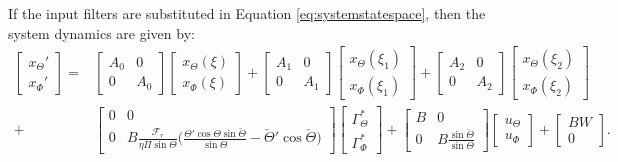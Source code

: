 \documentclass[../main.tex]{subfiles}
\begin{document}
	If the input filters are substituted in Equation \eqref{eq:systemstatespace}, then the system dynamics are given by:
	\begin{align}
	\begin{bmatrix}
	x_\Theta' \\
	x_\Phi'
	\end{bmatrix} =&
	\begin{bmatrix}
	A_0 & 0 \\
	0 & A_0
	\end{bmatrix}
	\begin{bmatrix}
	x_\Theta(\xi) \\
	x_\Phi(\xi)
	\end{bmatrix} + 
	\begin{bmatrix}
	A_1 & 0 \\
	0 & A_1
	\end{bmatrix}
	\begin{bmatrix}
	x_\Theta(\xi_1) \\
	x_\Phi(\xi_1)
	\end{bmatrix} +
	\begin{bmatrix}
	A_2 & 0 \\
	0 & A_2
	\end{bmatrix}
	\begin{bmatrix}
	x_\Theta(\xi_2) \\
	x_\Phi(\xi_2)
	\end{bmatrix} \nonumber\\
	+& \begin{bmatrix}
	0 & 0 \\
	0 & B\frac{\mathcal{F}_r}{\eta \Pi \sin \Theta} \bigg( \frac{\Theta' \cos \Theta \sin \check{\Theta}}{\sin \Theta}  - \check{\Theta}' \cos \check{\Theta}\bigg)
	\end{bmatrix}
	\begin{bmatrix}
	\Gamma_\Theta^* \\
	\Gamma_\Phi^*
	\end{bmatrix} + \begin{bmatrix}
	B & 0 \\
	0 & B\frac{\sin \check{\Theta}}{\sin \Theta}
	\end{bmatrix}
	\begin{bmatrix}
	u_\Theta \\
	u_\Phi
	\end{bmatrix} +
	\begin{bmatrix}
	BW \\
	0
	\end{bmatrix}.
	\label{eq:systemstatespace2}	
	\end{align}
\end{document}
